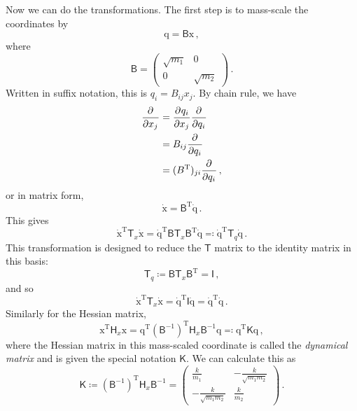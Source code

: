 \documentclass{article}
\theoremstyle{plain}\theoremheaderfont{\normalfont\itshape}\theorembodyfont{\rmfamily}\theoremseparator{.}\newtheorem*{rem}{Remark}\newtheorem*{ex}{Example}\newtheorem*{proof}{Proof}\newtheorem*{altp}{Alternative proof}
\theoremstyle{plain}\theoremheaderfont{\normalfont\bfseries}\theorembodyfont{\rmfamily}\theoremseparator{.}\newtheorem{thm}{Theorem}[section]\newtheorem{lem}[thm]{Lemma}\newtheorem{prop}[thm]{Proposition}\newtheorem*{cor}{Corollary}\newtheorem{defn}[thm]{Definition}\newtheorem{clm}[thm]{Claim}\newtheorem{clminproof}{Claim}
\theoremstyle{break}\theoremheaderfont{\normalfont\itshape}\theorembodyfont{\rmfamily}\theoremseparator{.\medskip}\newtheorem*{proofskip}{Proof}\newtheorem*{exs}{Examples}\newtheorem*{rems}{Remarks}
\theoremstyle{break}\theoremheaderfont{\normalfont\bfseries}\theorembodyfont{\rmfamily}\theoremseparator{.\medskip}\newtheorem{lemskip}[thm]{Lemma}\newtheorem{defnskip}[thm]{Definition}\newtheorem{propskip}[thm]{Proposition}\newtheorem{thmskip}[thm]{Theorem}
\numberwithin{equation}{section}
\newcommand{\tp}{^\mathrm{T}}
\newcommand{\pdv}[3][]{\frac{\partial^{#1} #2}{{\partial #3}^{#1}}}
\newcommand{\vb}[1]{\bm{\mathrm{#1}}}
\begin{document}
    Now we can do the transformations. The first step is to mass-scale the coordinates by
    \begin{equation}
        \vb{q}=\mathsf{B}\vb{x}\,,
    \end{equation}
    where
    \begin{equation}
        \mathsf{B}=\begin{pmatrix}
            \sqrt{m_1} & 0 \\
            0 & \sqrt{m_2}
        \end{pmatrix}\,.
    \end{equation}
    Written in suffix notation, this is \(q_i=B_{ij}x_j\). By chain rule, we have
    \begin{align}
        \pdv{}{x_j}&=\pdv{q_i}{x_j}\pdv{}{q_i}\notag \\
        &=B_{ij}\pdv{}{q_i}\notag \\
        &=(B\tp)_{ji}\pdv{}{q_i}\,,
    \end{align}
    or in matrix form,
    \begin{equation}
        \dot{\vb{x}}=\mathsf{B}\tp\dot{\vb{q}}\,.
    \end{equation}
    This gives
    \begin{equation}
        \vb{\dot{x}}\tp\mathsf{T}_x\vb{\dot{x}}=\vb{\dot{q}}\tp\mathsf{B}\mathsf{T}_x\mathsf{B}\tp\vb{\dot{q}}\eqqcolon\vb{\dot{q}}\tp\mathsf{T}_q\vb{\dot{q}}\,.
    \end{equation}
    This transformation is designed to reduce the \(\mathsf{T}\) matrix to the identity matrix in this basis:
    \begin{equation}
        \mathsf{T}_q\coloneqq\mathsf{B}\mathsf{T}_x\mathsf{B}\tp=\mathsf{I}\,,
    \end{equation}
    and so
    \begin{equation}
        \vb{\dot{x}}\tp\mathsf{T}_x\vb{\dot{x}}=\vb{\dot{q}}\tp\mathsf{I}\vb{\dot{q}}=\vb{\dot{q}}\tp\vb{\dot{q}}\,.
    \end{equation}
    Similarly for the Hessian matrix,
    \begin{equation}
        \vb{x}\tp\mathsf{H}_x\vb{x}=\vb{q}\tp(\mathsf{B}^{-1})\tp\mathsf{H}_x\mathsf{B}^{-1}\vb{q}\eqqcolon\vb{q}\tp\mathsf{K}\vb{q}\,,
    \end{equation}
    where the Hessian matrix in this mass-scaled coordinate is called the \textit{dynamical matrix} and is given the special notation \(\mathsf{K}\). We can calculate this as
    \begin{equation}
        \mathsf{K}\coloneqq (\mathsf{B}^{-1})\tp\mathsf{H}_x\mathsf{B}^{-1}=\begin{pmatrix}
            \frac{k}{m_1} & -\frac{k}{\sqrt{m_1m_2}} \\
            -\frac{k}{\sqrt{m_1m_2}} & \frac{k}{m_2}
        \end{pmatrix}\,.
    \end{equation}
\end{document}
